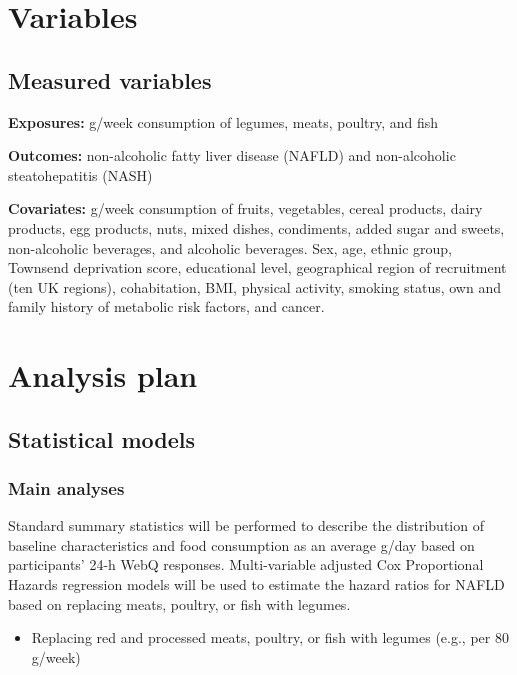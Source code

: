 \documentclass[
  11pt,
  a4paper,
  DIV=11,
  numbers=noendperiod,
  twocolumn]{scrartcl}
\providecommand{\tightlist}{%
  \setlength{\itemsep}{0pt}\setlength{\parskip}{0pt}}\usepackage{longtable,booktabs,array}
\begin{document}
\hypertarget{variables}{%
\section{Variables}\label{variables}}

\hypertarget{measured-variables}{%
\subsection{Measured variables}\label{measured-variables}}

\textbf{Exposures:} g/week consumption of legumes, meats, poultry, and
fish

\textbf{Outcomes:} non-alcoholic fatty liver disease (NAFLD) and
non-alcoholic steatohepatitis (NASH)

\textbf{Covariates:} g/week consumption of fruits, vegetables, cereal
products, dairy products, egg products, nuts, mixed dishes, condiments,
added sugar and sweets, non-alcoholic beverages, and alcoholic
beverages. Sex, age, ethnic group, Townsend deprivation score,
educational level, geographical region of recruitment (ten UK regions),
cohabitation, BMI, physical activity, smoking status, own and family
history of metabolic risk factors, and cancer.

\hypertarget{analysis-plan}{%
\section{Analysis plan}\label{analysis-plan}}

\hypertarget{statistical-models}{%
\subsection{Statistical models}\label{statistical-models}}

\hypertarget{main-analyses}{%
\subsubsection{Main analyses}\label{main-analyses}}

Standard summary statistics will be performed to describe the
distribution of baseline characteristics and food consumption as an
average g/day based on participants' 24-h WebQ responses. Multi-variable
adjusted Cox Proportional Hazards regression models will be used to
estimate the hazard ratios for NAFLD based on replacing meats, poultry,
or fish with legumes.

\begin{itemize}
\tightlist
\item
  Replacing red and processed meats, poultry, or fish with legumes
  (e.g., per 80 g/week)
\end{itemize}
\end{document}
